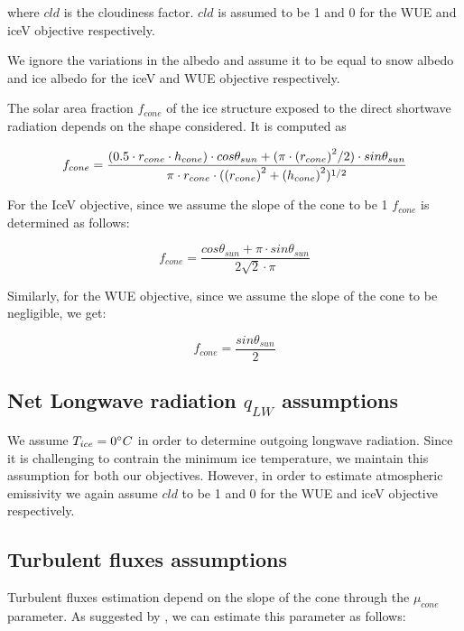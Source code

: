 \documentclass[tc, manuscript]{copernicus}
\begin{document}
where $cld$ is the cloudiness factor. $cld$ is assumed to be 1 and 0 for the WUE and iceV objective
respectively.

We ignore the variations in the albedo and assume it to be equal to snow albedo and ice albedo for the iceV and
WUE objective respectively. 

The solar area fraction $f_{cone}$ of the ice structure exposed to the direct shortwave radiation depends on the
shape considered. It is computed as

\begin{equation}
		f_{cone} =\frac{(0.5 \cdot r_{cone} \cdot h_{cone}) \cdot cos \theta_{sun} +(\pi \cdot
			{(r_{cone})}^2/2) \cdot sin \theta_{sun} }{\pi \cdot r_{cone} \cdot ({(r_{cone})}^2+{(h_{cone})}^2)^{1/2}}\\
\end{equation}

For the IceV objective, since we assume the slope of the cone to be 1 $f_{cone}$ is determined
as follows:

\begin{equation}
		f_{cone} =\frac{ cos \theta_{sun} + \pi \cdot sin \theta_{sun} }{2\sqrt{2} \cdot \pi }
\end{equation}

Similarly, for the WUE objective, since we assume the slope of the cone to be negligible, we get:

\begin{equation}
		f_{cone} =\frac{ sin \theta_{sun} }{2 }
\end{equation}

\subsection{Net Longwave radiation \texorpdfstring{$q_{LW}$}{Lg} assumptions} \label{sec:LW}

We assume $T_{ice} = 0 ^{\circ} C$ in order to determine outgoing longwave radiation. Since it is challenging to
contrain the minimum ice temperature, we maintain this assumption for both our objectives. However, in order to
estimate atmospheric emissivity we again assume $cld$ to be 1 and 0 for the WUE and iceV objective respectively.

\subsection{Turbulent fluxes assumptions} \label{sec:Qs}

Turbulent fluxes estimation depend on the slope of the cone through the $\mu_{cone}$ parameter. As suggested 
by \citet{oerlemansBriefCommunicationGrowth2021}, we can estimate this parameter as follows:
\end{document}
